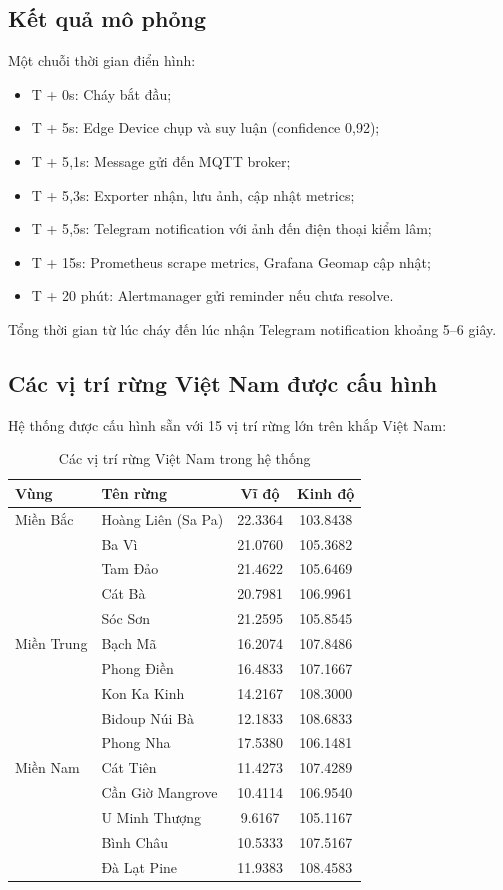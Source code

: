 \documentclass[12pt,a4paper]{report}
\begin{document}
\subsection{Kết quả mô phỏng}

Một chuỗi thời gian điển hình:
\begin{itemize}
  \item T + 0s: Cháy bắt đầu;
  \item T + 5s: Edge Device chụp và suy luận (confidence 0{,}92);
  \item T + 5{,}1s: Message gửi đến MQTT broker;
  \item T + 5{,}3s: Exporter nhận, lưu ảnh, cập nhật metrics;
  \item T + 5{,}5s: Telegram notification với ảnh đến điện thoại kiểm lâm;
  \item T + 15s: Prometheus scrape metrics, Grafana Geomap cập nhật;
  \item T + 20 phút: Alertmanager gửi reminder nếu chưa resolve.
\end{itemize}

Tổng thời gian từ lúc cháy đến lúc nhận Telegram notification khoảng 5--6 giây.

\subsection{Các vị trí rừng Việt Nam được cấu hình}

Hệ thống được cấu hình sẵn với 15 vị trí rừng lớn trên khắp Việt Nam:

\begin{table}[h]
  \centering
  \caption{Các vị trí rừng Việt Nam trong hệ thống}
  \begin{tabular}{llcc}
    \toprule
    Vùng & Tên rừng & Vĩ độ & Kinh độ \\
    \midrule
    Miền Bắc & Hoàng Liên (Sa Pa) & 22.3364 & 103.8438 \\
    & Ba Vì & 21.0760 & 105.3682 \\
    & Tam Đảo & 21.4622 & 105.6469 \\
    & Cát Bà & 20.7981 & 106.9961 \\
    & Sóc Sơn & 21.2595 & 105.8545 \\
    \midrule
    Miền Trung & Bạch Mã & 16.2074 & 107.8486 \\
    & Phong Điền & 16.4833 & 107.1667 \\
    & Kon Ka Kinh & 14.2167 & 108.3000 \\
    & Bidoup Núi Bà & 12.1833 & 108.6833 \\
    & Phong Nha & 17.5380 & 106.1481 \\
    \midrule
    Miền Nam & Cát Tiên & 11.4273 & 107.4289 \\
    & Cần Giờ Mangrove & 10.4114 & 106.9540 \\
    & U Minh Thượng & 9.6167 & 105.1167 \\
    & Bình Châu & 10.5333 & 107.5167 \\
    & Đà Lạt Pine & 11.9383 & 108.4583 \\
    \bottomrule
  \end{tabular}
\end{table}
\end{document}
